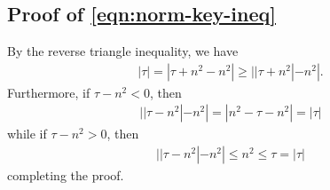 \documentclass[12pt,reqno]{amsart}
\numberwithin{equation}{section}  %
\numberwithin{figure}{section}
\theoremstyle{plain}
\theoremstyle{definition}
\theoremstyle{remark}
\begin{document}
\subsection{Proof of \eqref{eqn:norm-key-ineq}}
\label{ssec:pf-mod-princ}
By the reverse triangle inequality, we have
%
%
\begin{equation*}
\begin{split}
  | \tau | = | \tau + n^{2} - n^{2} | \ge | | \tau + n^{2} | - n^{2} |.
\end{split}
\end{equation*}
%
%
Furthermore, if $\tau - n^{2} < 0$, then
%
%
\begin{equation*}
\begin{split}
  | | \tau - n^{2} | - n^{2} | = | n^{2} - \tau - n^{2} | = | \tau |
\end{split}
\end{equation*}
%
%
while if $\tau - n^{2} > 0$, then
%
%
\begin{equation*}
\begin{split}
  | | \tau - n^{2} | - n^{2} | \le n^{2} \le \tau = |\tau|
\end{split}
\end{equation*}
%
%
completing the proof. \qquad \qedsymbol
%
%
\end{document}
